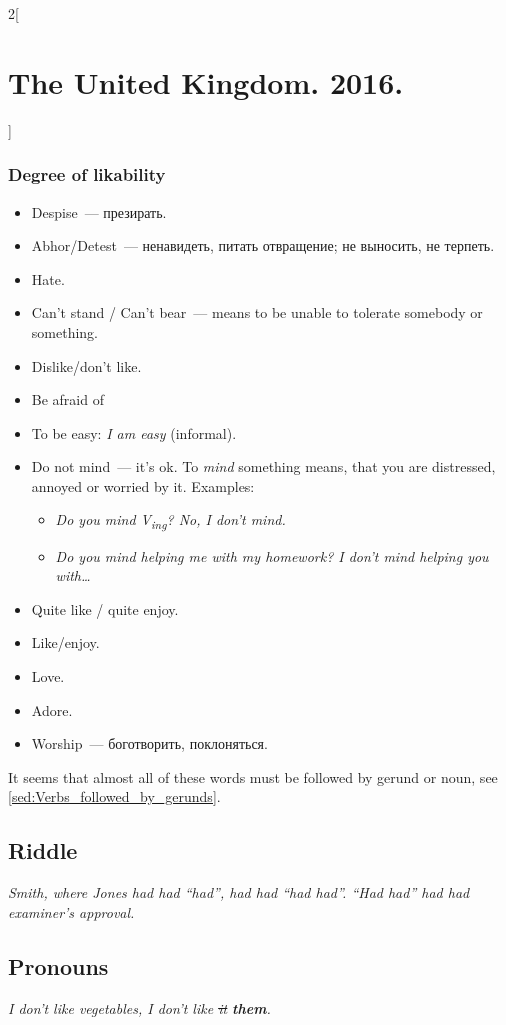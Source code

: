 \documentclass[10pt,a4paper]{article}
\begin{document}
\begin{multicols}{2}[\section{The United Kingdom. 2016.}]
\subsubsection{Degree of likability}
\begin{itemize}
  \item Despise~--- презирать.
  \item Abhor/Detest~--- ненавидеть, питать отвращение; не выносить, не терпеть.
  \item Hate.
  \item Can't stand / Can't bear~--- means to be unable to tolerate somebody or something.
  \item Dislike/don't like.
  \item Be afraid of
  \item To be easy: \textit{I am easy} (informal).
  \item Do not mind~--- it's ok. To \textit{mind} something means, that you are distressed, annoyed or worried
  by it. Examples:
  \begin{itemize}
    \item \textit{Do you mind V\textsubscript{ing}? No, I don't mind.}
    \item \textit{Do you mind helping me with my homework? I don't mind helping you with\dots}
  \end{itemize}
  \item Quite like / quite enjoy.
  \item Like/enjoy.
  \item Love.
  \item Adore.
  \item Worship~--- боготворить, поклоняться.
\end{itemize}
\vspace{-\parskip}
It seems that almost all of these words must be followed by gerund or noun, see \ref{sed:Verbs_followed_by_gerunds}.


\subsection{Riddle}
\textit{Smith, where Jones had had ``had'', had had ``had had''. ``Had had'' had had examiner's approval.}




\subsection{Pronouns}
\textit{I don’t like vegetables, I don't like \sout{it} \textbf{them}.}




\end{multicols}
\end{document}
